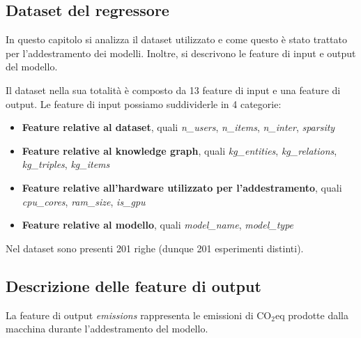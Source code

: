 \subsection {Dataset del regressore}
In questo capitolo si analizza il dataset utilizzato e come questo è stato trattato per l'addestramento dei modelli. Inoltre, si descrivono le feature di input e output del modello.

\noindent Il dataset nella sua totalità è composto da 13 feature di input e una feature di output. Le feature di input possiamo suddividerle in 4 categorie:
\begin{itemize}
    \item \textbf{Feature relative al dataset}, quali \textit{n\_users}, \textit{n\_items}, \textit{n\_inter}, \textit{sparsity}
    \item \textbf{Feature relative al knowledge graph}, quali \textit{kg\_entities}, \textit{kg\_relations}, \textit{kg\_triples}, \textit{kg\_items}
    \item \textbf{Feature relative all'hardware utilizzato per l'addestramento}, quali \textit{cpu\_cores}, \textit{ram\_size}, \textit{is\_gpu}
    \item \textbf{Feature relative al modello}, quali \textit{model\_name}, \textit{model\_type}
\end{itemize}
Nel dataset sono presenti 201 righe (dunque 201 esperimenti distinti).
\subsection{Descrizione delle feature di output}
La feature di output \textit{emissions} rappresenta le emissioni di CO$_2$eq prodotte dalla macchina durante l'addestramento del modello.
